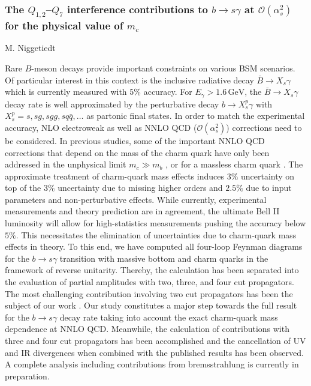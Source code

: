 \documentclass{FBR_Bericht_2025}
\begin{document}
\begin{refsection}
\subsubsection{The $Q_{1,2}$--$Q_7$ interference contributions to $b \to s \gamma$ at ${\mathcal{O}}(\alpha_s^2)$ for the physical value of $m_c$}
\begin{Namen}
M. Niggetiedt
\end{Namen}
%
Rare $B$-meson decays provide important constraints on various BSM scenarios. Of particular interest in this context is the inclusive radiative decay $\bar{B}\to X_s\gamma$ which is currently measured with $5\%$ accuracy. %
For $E_\gamma > 1.6 \,\mathrm{GeV}$, the $\bar{B}\to X_s\gamma$ decay rate is well approximated by the perturbative decay $b\to X_s^p\gamma$ with $X_s^p = s,sg,sgg,sq\bar{q},\ldots$ as partonic final states. 
%
In order to match the experimental accuracy, NLO electroweak as well as NNLO QCD (${\mathcal{O}}(\alpha_s^2)$) corrections need to be considered. In previous studies, some of the important NNLO QCD corrections that depend on the mass of the charm quark have only been addressed in the unphysical limit $m_c \gg m_b$ \cite{Misiak:2010sk}, or for a massless charm quark \cite{Czakon:2015exa}. The approximate treatment of charm-quark mass effects induces $3\%$ uncertainty on top of the $3\%$ uncertainty due to missing higher orders and $2.5\%$ due to input parameters and non-perturbative effects. 
%
While currently, experimental measurements and theory prediction are in agreement, the ultimate Bell II luminosity will allow for high-statistics measurements pushing the accuracy below $5\%$. This necessitates the elimination of uncertainties due to charm-quark mass effects in theory. 
%
To this end, we have computed all four-loop Feynman diagrams for the $b \to s \gamma$ transition with massive bottom and charm quarks in the framework of reverse unitarity. Thereby, the calculation has been separated into the evaluation of partial amplitudes with two, three, and four cut propagators. The most challenging contribution involving two cut propagators has been the subject of our work \cite{Czaja:2023ren}. 
%
Our study constitutes a major step towards the full result for the $b \to s \gamma$ decay rate taking into account the exact charm-quark mass dependence at NNLO QCD. Meanwhile, the calculation of contributions with three and four cut propagators has been accomplished and the cancellation of UV and IR divergences when combined with the published results \cite{Czaja:2023ren} has been observed. A complete analysis including contributions from bremsstrahlung is currently in preparation. 
%
\printbibliography[heading=subbibliography]
\end{refsection}
\end{document}
